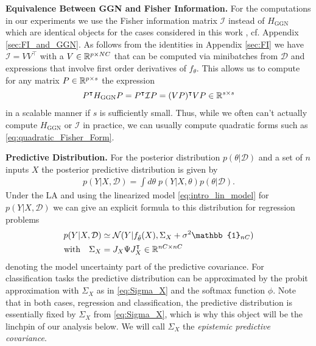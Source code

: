 \textbf{Equivalence Between GGN and Fisher Information.}
For the computations in our experiments we use the Fisher information matrix $\mathcal{I}$ instead of $H_{\mathrm{GGN}}$ which are identical objects for the cases considered in this work \cite{Heskes2000, Martens14, Dauphin2014}, cf. Appendix \ref{sec:FI_and_GGN}. As follows from the identities in Appendix \ref{sec:FI} we have $\mathcal{I}=VV^\intercal$ with a $V\in \mathbb{R}^{p\times NC}$ that can be computed via minibatches from $\mathcal{D}$ and expressions that involve first order derivatives of $f_\theta$. This allows us to compute for any matrix $P\in \mathbb{R}^{p\times s}$ the expression 
\begin{align}
\label{eq:quadratic_Fisher_Form}
P^\intercal H_{\mathrm{GGN}}P =P^\intercal \mathcal{I} P  = (VP)^\intercal VP \in \mathbb{R}^{s\times s}
\end{align}
in a scalable manner if $s$ is sufficiently small. Thus, while we often can't actually compute $H_{\mathrm{GGN}}$ or $\mathcal{I}$ in practice, we can usually compute quadratic forms such as \eqref{eq:quadratic_Fisher_Form}.


\textbf{Predictive Distribution.}
For the posterior distribution $p(\theta|\mathcal{D})$ and a set of $n$ inputs $X$ the posterior predictive distribution is given by
\begin{align}
    \label{eq:pred_distribution}
    p(Y|X, \mathcal{D}) = \int d\theta\; p(Y| X, \theta) p(\theta | \mathcal{D}).
\end{align}
Under the LA and using the linearized model \eqref{eq:intro_lin_model} for $p(Y|X, \mathcal{D})$ we can give an explicit formula to this distribution for regression problems
\begin{align}
    \label{eq:PredDistrGauss}
    p(Y|X,\mathcal{D}) & \simeq \mathcal{N}(Y|f_{\map{\theta}}(X), \Sigma_X + \sigma^2 \mathbb{1}_{nC} )
    \\
    \label{eq:Sigma_X}
    \text{with} \quad
    \Sigma_X & = J_{X} \Psi J_{X}^\intercal  \in \RR^{nC\times nC}
\end{align}
denoting the model uncertainty part of the predictive covariance.
For classification tasks the predictive distribution can be approximated by the probit approximation \cite{Bishop2006} 
with $\Sigma_X$ as in \eqref{eq:Sigma_X} and the softmax function $\phi$. Note that in both cases, regression and classification, the predictive distribution is essentially fixed by $\Sigma_X$ from \eqref{eq:Sigma_X}, which is why this object will be the linchpin of our analysis below. We will call $\Sigma_X$ the \emph{epistemic predictive covariance}.

